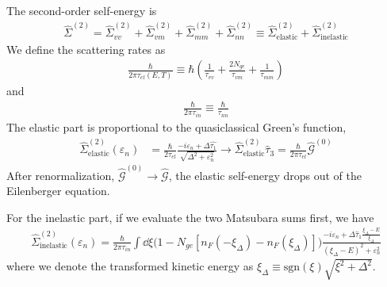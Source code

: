 \documentclass[]{article}
\begin{document}
The second-order self-energy is
\begin{align}
    \widehat{\Sigma}^{(2)} = \widehat{\Sigma}_{vv}^{(2)} + \widehat{\Sigma}_{vm}^{(2)}
    + \widehat{\Sigma}_{mm}^{(2)} +\widehat{\Sigma}_{nn}^{(2)}
    \equiv \widehat{\Sigma}^{(2)}_\text{elastic} + \widehat{\Sigma}^{(2)}_\text{inelastic}
\end{align}
We define the scattering rates as
\begin{align}
    \frac{\hbar}{2\pi\tau_{el}(E, T)} \equiv \hbar\left(\frac{1}{\tau_{vv}} + \frac{2N_{ge}}{\tau_{vm}}
    + \frac{1}{\tau_{mm}}\right)
\end{align}
and
\begin{align}
    \frac{\hbar}{2\pi\tau_{in}} \equiv \frac{\hbar}{\tau_{nn}}
\end{align}
The elastic part is proportional to the quasiclassical Green's function,
\begin{align}
    \widehat{\Sigma}^{(2)}_\text{elastic}(\varepsilon_n)
     & =\frac{\hbar}{2\tau_{el}}
    \frac{-i\varepsilon_n+\Delta\widehat{\tau_1}}{\sqrt{\Delta^2+\varepsilon_n^2}}
    \rightarrow \widehat{\Sigma}^{(2)}_\text{elastic}\widehat{\tau}_3 = \frac{\hbar}{2\pi\tau_{el}}\widehat{\mathcal{G}}^{(0)}
\end{align}
After renormalization, $\widehat{\mathcal{G}}^{(0)} \rightarrow \widehat{\mathcal{G}}$,
the elastic self-energy drops out of the Eilenberger equation.

For the inelastic part, if we evaluate the two Matsubara sums first, we have
\begin{align}
    \widehat{\Sigma}^{(2)}_\text{inelastic}(\varepsilon_n)
     = \frac{\hbar}{2\pi\tau_{in}}\int\dd\xi\bigg(1-N_{ge}[n_F(-\xi_\Delta)-n_F(\xi_\Delta)]\bigg)
    \frac{-i\varepsilon_n+\Delta\widehat{\tau}_1\frac{\xi_\Delta-E}{\xi_\Delta}}
    {(\xi_\Delta-E)^2+\varepsilon_n^2}
\end{align}
where we denote the transformed kinetic energy as $\xi_\Delta\equiv\text{sgn}(\xi)\sqrt{\xi^2+\Delta^2}$.
\end{document}
